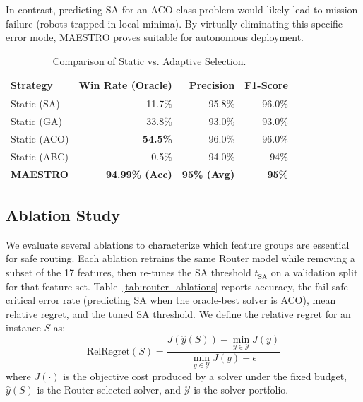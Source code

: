 \documentclass[conference]{IEEEtran}
\newcommand{\systemname}{MAESTRO}
\begin{document}
In contrast, predicting SA for an ACO-class problem would likely lead to mission failure (robots trapped in local minima). By virtually eliminating this specific error mode, \systemname{} proves suitable for autonomous deployment.

\begin{table}[t]
\centering
\caption{Comparison of Static vs. Adaptive Selection.}
\label{tab:router_performance}
\begin{tabular}{@{}lrrr@{}}
\toprule
Strategy & Win Rate (Oracle) & Precision & F1-Score \\
\midrule
Static (SA) & 11.7\% & 95.8\% & 96.0\% \\
Static (GA) & 33.8\% & 93.0\% & 93.0\% \\
Static (ACO) & \textbf{54.5\%} & 96.0\% & 96.0\% \\
Static (ABC) & 0.5\% & 94.0\% & 94\% \\
\textbf{\systemname{}} & \textbf{94.99\% (Acc)} & \textbf{95\% (Avg)} & \textbf{95\%} \\
\bottomrule
\end{tabular}
\end{table}


\subsection{Ablation Study}
\label{sec:ablations}
We evaluate several ablations to characterize which feature groups are essential for safe routing. Each ablation retrains the same Router model while removing a subset of the 17 features, then re-tunes the SA threshold $t_{\text{SA}}$ on a validation split for that feature set. Table~\ref{tab:router_ablations} reports accuracy, the fail-safe critical error rate (predicting SA when the oracle-best solver is ACO), mean relative regret, and the tuned SA threshold. We define the relative regret for an instance $S$ as:
\begin{equation}
    \text{RelRegret}(S) = \frac{J(\hat{y}(S)) - \min_{y \in \mathcal{Y}} J(y)}{\min_{y \in \mathcal{Y}} J(y) + \epsilon}
\end{equation}
where $J(\cdot)$ is the objective cost produced by a solver under the fixed budget, $\hat{y}(S)$ is the Router-selected solver, and $\mathcal{Y}$ is the solver portfolio.
\end{document}
